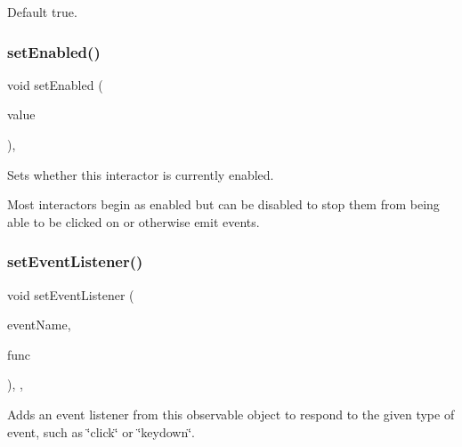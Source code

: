 Default true. \mbox{\label{classsgl_1_1GInteractor_ab831367dd84bbd579e02e55bacb21343}} 
\subsubsection{\texorpdfstring{set\+Enabled()}{setEnabled()}}
{\footnotesize\ttfamily void set\+Enabled (\begin{DoxyParamCaption}\item[{bool}]{value }\end{DoxyParamCaption})\hspace{0.3cm}{\ttfamily [virtual]}, {\ttfamily [inherited]}}



Sets whether this interactor is currently enabled. 

Most interactors begin as enabled but can be disabled to stop them from being able to be clicked on or otherwise emit events. \mbox{\label{classsgl_1_1GObservable_ad2f6d34961c50f6c1e0659990b79f741}} 
\subsubsection{\texorpdfstring{set\+Event\+Listener()}{setEventListener()}\hspace{0.1cm}{\footnotesize\ttfamily [1/2]}}
{\footnotesize\ttfamily void set\+Event\+Listener (\begin{DoxyParamCaption}\item[{const std\+::string \&}]{event\+Name,  }\item[{\mbox{\hyperlink{namespacesgl_ae9f3e9eab70035da1a2b114e21357b25}{G\+Event\+Listener}}}]{func }\end{DoxyParamCaption})\hspace{0.3cm}{\ttfamily [protected]}, {\ttfamily [virtual]}, {\ttfamily [inherited]}}



Adds an event listener from this observable object to respond to the given type of event, such as \char`\"{}click\char`\"{} or \char`\"{}keydown\char`\"{}. 

